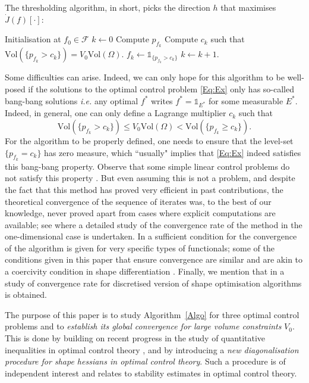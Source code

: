 \documentclass{article}
\renewcommand{\geq}{\geqslant}
\renewcommand{\leq}{\leqslant}
\def\O{{\Omega}}
\numberwithin{equation}{section}
\begin{document}
The thresholding algorithm, in short, picks the direction $h$ that maximises $\dot J(f)[\cdot]$:
\begin{algorithm}[H]
\caption{Thresholding algorithm}\label{Algo}
\begin{algorithmic}[1]
\State Initialisation at $f_0\in \mathcal F$
\State $k\gets 0$
\State Compute $p_{f_k}$
\State Compute $c_k$ such that $\mathrm{Vol}(\{p_{f_k}>c_k\})=V_0\mathrm{Vol}(\O)$.
\State $f_k\gets \mathds 1_{\{p_{f_k}>c_k\}}$
\State $k\gets k+1$.
\end{algorithmic}
\end{algorithm}
Some difficulties can arise. Indeed, we can only hope for this algorithm to be well-posed if the solutions to the optimal control problem \eqref{Eq:Ex} only has so-called bang-bang solutions \emph{i.e.} any optimal $f^*$ writes $f^*=\mathds 1_{E^*}$ for some measurable $E^*$. Indeed, in general, one can only define a Lagrange multiplier $c_k$ such that 
\[ \mathrm{Vol}(\{p_{f_k}>c_k\})\leq V_0\mathrm{Vol}(\O)< \mathrm{Vol}(\{p_{f_k}\geq c_k\}).\] For the algorithm to be properly defined, one needs to ensure that the level-set $\{p_{f_k}=c_k\}$ has zero measure, which ``usually" implies that \eqref{Eq:Ex} indeed satisfies this bang-bang property. Observe that some simple linear control problems do not satisfy this property \cite{Nadin_2020}. But even assuming this is not a problem, and despite the fact that this method has proved very efficient in past contributions, the theoretical convergence of the sequence of iterates was, to the best of our knowledge, never proved apart from cases where explicit computations are available; see \cite{KaoMohammadiOsting} where a detailed study of the convergence rate of the method in the one-dimensional case is undertaken. In \cite[Condition (2.4)]{Cea} a sufficient condition for the convergence of the algorithm is given for very specific types of functionals; some of the conditions given in this paper that ensure convergence are similar and are akin to a coercivity condition in shape differentiation \cite{DambrineLamboley}. Finally, we mention that in \cite{Eppler_2007} a study of convergence rate for discretised version of shape optimisation algorithms is obtained.


The purpose of this paper is to study Algorithm \ref{Algo} for three optimal control problems and to \emph{establish its global convergence for large volume constraints} $V_0$. This is done by building on recent progress in the study of quantitative inequalities in optimal control theory \cite{MazariNLA,MRB2020}, and by introducing a \emph{new diagonalisation procedure for shape hessians in optimal control theory}. Such a procedure is of independent interest and relates to stability estimates in optimal control theory.
\end{document}
